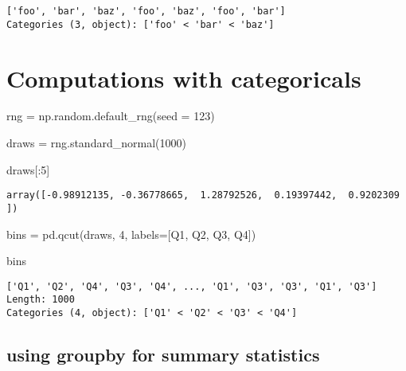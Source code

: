 \documentclass[
  letterpaper,
  DIV=11,
  numbers=noendperiod]{scrreprt}
\newenvironment{Shaded}{\begin{snugshade}}{\end{snugshade}}
\newcommand{\DecValTok}[1]{\textcolor[rgb]{0.68,0.00,0.00}{#1}}
\newcommand{\NormalTok}[1]{\textcolor[rgb]{0.00,0.23,0.31}{#1}}
\newcommand{\OperatorTok}[1]{\textcolor[rgb]{0.37,0.37,0.37}{#1}}
\newcommand{\StringTok}[1]{\textcolor[rgb]{0.13,0.47,0.30}{#1}}
\begin{document}
\begin{verbatim}
['foo', 'bar', 'baz', 'foo', 'baz', 'foo', 'bar']
Categories (3, object): ['foo' < 'bar' < 'baz']
\end{verbatim}

\hypertarget{computations-with-categoricals}{%
\section{Computations with
categoricals}\label{computations-with-categoricals}}

\begin{Shaded}
\begin{Highlighting}[]
\NormalTok{rng }\OperatorTok{=}\NormalTok{ np.random.default\_rng(seed }\OperatorTok{=} \DecValTok{123}\NormalTok{)}

\NormalTok{draws }\OperatorTok{=}\NormalTok{ rng.standard\_normal(}\DecValTok{1000}\NormalTok{)}

\NormalTok{draws[:}\DecValTok{5}\NormalTok{]}
\end{Highlighting}
\end{Shaded}

\begin{verbatim}
array([-0.98912135, -0.36778665,  1.28792526,  0.19397442,  0.9202309 ])
\end{verbatim}

\begin{Shaded}
\begin{Highlighting}[]
\NormalTok{bins }\OperatorTok{=}\NormalTok{ pd.qcut(draws, }\DecValTok{4}\NormalTok{, labels}\OperatorTok{=}\NormalTok{[}\StringTok{\textquotesingle{}Q1\textquotesingle{}}\NormalTok{, }\StringTok{\textquotesingle{}Q2\textquotesingle{}}\NormalTok{, }\StringTok{\textquotesingle{}Q3\textquotesingle{}}\NormalTok{, }\StringTok{\textquotesingle{}Q4\textquotesingle{}}\NormalTok{])}

\NormalTok{bins}
\end{Highlighting}
\end{Shaded}

\begin{verbatim}
['Q1', 'Q2', 'Q4', 'Q3', 'Q4', ..., 'Q1', 'Q3', 'Q3', 'Q1', 'Q3']
Length: 1000
Categories (4, object): ['Q1' < 'Q2' < 'Q3' < 'Q4']
\end{verbatim}

\hypertarget{using-groupby-for-summary-statistics}{%
\subsection{using groupby for summary
statistics}\label{using-groupby-for-summary-statistics}}
\end{document}
